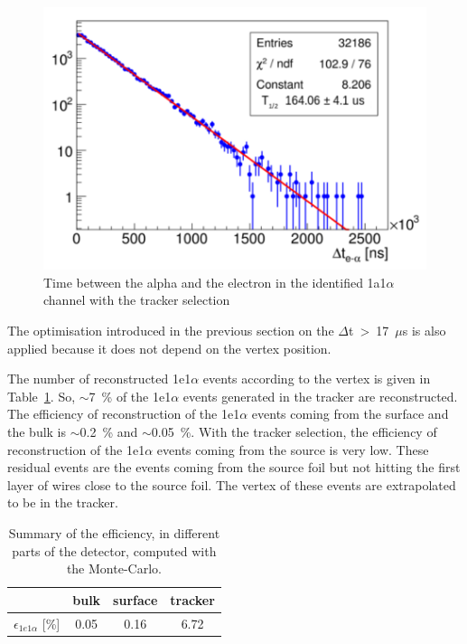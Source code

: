 \documentclass[main.tex]{subfiles}
\begin{document}
\begin{figure}[h!]
\begin{center}
\includegraphics[scale=0.6]{pictures/Chap5/delta_t_tracker_selection_tracker.pdf}
\caption{Time between the alpha and the electron in the identified 1a1$\alpha$ channel with the tracker selection}
\label{delta_t_tracker_selection}
\end{center}
\end{figure}


\bigskip


\noindent The optimisation introduced in the previous section on the $\Delta$t~>~17~$\mu$s is also applied because it does not depend on the vertex position. 


\bigskip


\noindent The number of reconstructed 1e1$\alpha$ events according to the vertex is given in Table~\ref{efficiency_different_parts_tracker}. So, $\sim$7~\% of the 1e1$\alpha$ events generated in the tracker are reconstructed. The efficiency of reconstruction of the 1e1$\alpha$ events coming from the surface and the bulk is $\sim$0.2~\% and $\sim$0.05~\%. With the tracker selection, the efficiency of reconstruction of the 1e1$\alpha$ events coming from the source is very low. These residual events are the events coming from the source foil but not hitting the first layer of wires close to the source foil. The vertex of these events are extrapolated to be in the tracker.


\begin{table}[h!]
\begin{center}
\begin{tabular}{c|c|c|c}
           & bulk   & surface & tracker \\
\hline
$\epsilon_{1e1\alpha}$ [\%] & 0.05 & 0.16  & 6.72 \\
\hline
\end{tabular}
\end{center}
\caption{Summary of the efficiency, in different parts of the detector, computed with the Monte-Carlo.}
\label{efficiency_different_parts_tracker}
\end{table}
\end{document}
